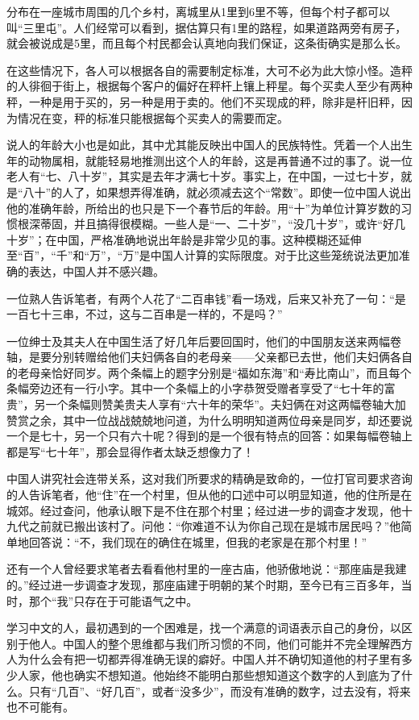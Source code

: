 \documentclass[12pt,oneside]{book}
\begin{document}
\begin{common-format}
分布在一座城市周围的几个乡村，离城里从1里到6里不等，但每个村子都可以叫“三里屯”。人们经常可以看到，据估算只有1里的路程，如果道路两旁有房子，就会被说成是5里，而且每个村民都会认真地向我们保证，这条街确实是那么长。 

在这些情况下，各人可以根据各自的需要制定标准，大可不必为此大惊小怪。造秤的人徘徊于街上，根据每个客户的偏好在秤杆上镶上秤星。每个买卖人至少有两种秤，一种是用于买的，另一种是用于卖的。他们不买现成的秤，除非是杆旧秤，因为情况在变，秤的标准只能根据每个买卖人的需要而定。 

说人的年龄大小也是如此，其中尤其能反映出中国人的民族特性。凭着一个人出生年的动物属相，就能轻易地推测出这个人的年龄，这是再普通不过的事了。说一位老人有“七、八十岁”，其实是去年才满七十岁。事实上，在中国，一过七十岁，就是“八十”的人了，如果想弄得准确，就必须减去这个“常数”。即使一位中国人说出他的准确年龄，所给出的也只是下一个春节后的年龄。用“十”为单位计算岁数的习惯根深蒂固，并且搞得很模糊。一些人是“一、二十岁”，“没几十岁”，或许“好几十岁”；在中国，严格准确地说出年龄是非常少见的事。这种模糊还延伸至“百”，“千”和“万”，“万”是中国人计算的实际限度。对于比这些笼统说法更加准确的表达，中国人并不感兴趣。 

一位熟人告诉笔者，有两个人花了“二百串钱”看一场戏，后来又补充了一句：“是一百七十三串，不过，这与二百串是一样的，不是吗？”

一位绅士及其夫人在中国生活了好几年后要回国时，他们的中国朋友送来两幅卷轴，是要分别转赠给他们夫妇俩各自的老母亲——父亲都已去世，他们夫妇俩各自的老母亲恰好同岁。两个条幅上的题字分别是“福如东海”和“寿比南山”，而且每个条幅旁边还有一行小字。其中一个条幅上的小字恭贺受赠者享受了“七十年的富贵”，另一个条幅则赞美贵夫人享有“六十年的荣华”。夫妇俩在对这两幅卷轴大加赞赏之余，其中一位战战兢兢地问道，为什么明明知道两位母亲是同岁，却还要说一个是七十，另一个只有六十呢？得到的是一个很有特点的回答：如果每幅卷轴上都是写“七十年”，那会显得作者太缺乏想像力了！ 

中国人讲究社会连带关系，这对我们所要求的精确是致命的，一位打官司要求咨询的人告诉笔者，他“住”在一个村里，但从他的口述中可以明显知道，他的住所是在城郊。经过查问，他承认眼下是不住在那个村里；经过进一步的调查才发现，他十九代之前就已搬出该村了。问他：“你难道不认为你自己现在是城市居民吗？”他简单地回答说：“不，我们现在的确住在城里，但我的老家是在那个村里！” 

还有一个人曾经要求笔者去看看他村里的一座古庙，他骄傲地说：“那座庙是我建的。”经过进一步调查才发现，那座庙建于明朝的某个时期，至今已有三百多年，当时，那个“我”只存在于可能语气之中。 

学习中文的人，最初遇到的一个困难是，找一个满意的词语表示自己的身份，以区别于他人。中国人的整个思维都与我们所习惯的不同，他们可能并不完全理解西方人为什么会有把一切都弄得准确无误的癖好。中国人并不确切知道他的村子里有多少人家，他也确实不想知道。他始终不能明白那些想知道这个数字的人到底为了什么。只有“几百”、“好几百”，或者“没多少”，而没有准确的数字，过去没有，将来也不可能有。 


\end{common-format}
\end{document}
